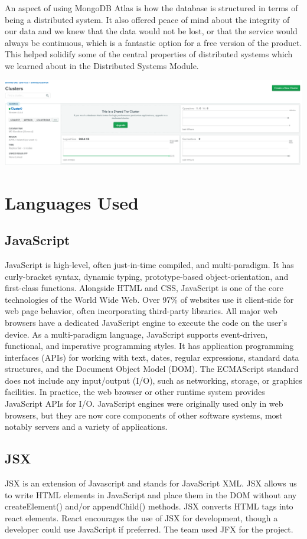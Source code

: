 An aspect of using MongoDB Atlas is how the database is structured in terms of being a distributed system. It also offered peace of mind about the integrity of our data and we knew that the data would not be lost, or that the service would always be continuous, which is a fantastic option for a free version of the product.
This helped solidify  some of the central properties of distributed systems which we learned about in the Distributed Systems Module.
\begin{center}
      \includegraphics[scale=0.5]{img/clusterDB.PNG}
\end{center}

\section{Languages Used}
\subsection{JavaScript}
JavaScript is high-level, often just-in-time compiled, and multi-paradigm. It has curly-bracket syntax, dynamic typing, prototype-based object-orientation, and first-class functions.
Alongside HTML and CSS, JavaScript is one of the core technologies of the World Wide Web. Over 97\% of websites use it client-side for web page behavior, often incorporating third-party libraries. All major web browsers have a dedicated JavaScript engine to execute the code on the user's device.
As a multi-paradigm language, JavaScript supports event-driven, functional, and imperative programming styles. It has application programming interfaces (APIs) for working with text, dates, regular expressions, standard data structures, and the Document Object Model (DOM).
The ECMAScript standard does not include any input/output (I/O), such as networking, storage, or graphics facilities. In practice, the web browser or other runtime system provides JavaScript APIs for I/O.
JavaScript engines were originally used only in web browsers, but they are now core components of other software systems, most notably servers and a variety of applications.\cite{javascript}
\subsection{JSX}
JSX is an extension of Javascript and stands for JavaScript XML.
JSX allows us to write HTML elements in JavaScript and place them in the DOM without any createElement()  and/or appendChild() methods. JSX converts HTML tags into react elements.\cite{jsx}
React encourages the use of JSX for development, though a developer could use JavaScript if preferred.
The team used JFX for the project.


